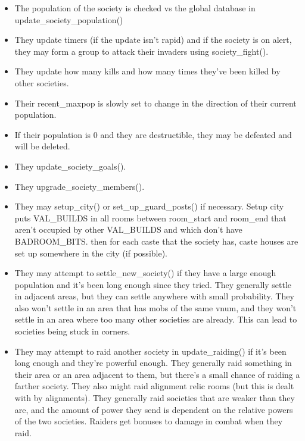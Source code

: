 \begin{itemize}

\item The population of the society is checked vs the global database
in update\_society\_population()

\item They update timers (if the update isn't rapid) and if the society is on 
alert, they may form a group to attack their invaders using
society\_fight().

\item They update how many kills and how many times they've been
killed by other societies.

\item Their recent\_maxpop is slowly set to change in the direction
of their current population.

\item If their population is 0 and they are destructible, they may
be defeated and will be deleted.

\item They update\_society\_goals().

\item They upgrade\_society\_members().

\item They may setup\_city() or set\_up\_guard\_posts() if necessary. Setup
  city puts VAL\_BUILDS in all rooms between room\_start and room\_end that
  aren't occupied by other VAL\_BUILDS and which don't have
  BADROOM\_BITS. then for each caste that the society has, caste
  houses are set up somewhere in the city (if possible).

\item They may attempt to settle\_new\_society() if they have a large
enough population and it's been long enough since they tried. They generally
settle in adjacent areas, but they can settle anywhere with small
probability. They also won't settle in an area that has mobs of
the same vnum, and they won't settle in an area where too many other
societies are already. This can lead to societies being stuck in corners.

\item They may attempt to raid another society in 
update\_raiding() if it's been long enough and they're powerful
enough. They generally raid something in their area or an area
adjacent to them, but there's a small chance of raiding a farther
society. They also might raid alignment relic rooms (but this is
dealt with by alignments). They generally raid societies that are
weaker than they are, and the amount of power they send is dependent
on the relative powers of the two societies. Raiders get bonuses
to damage in combat when they raid.


\end{itemize}
